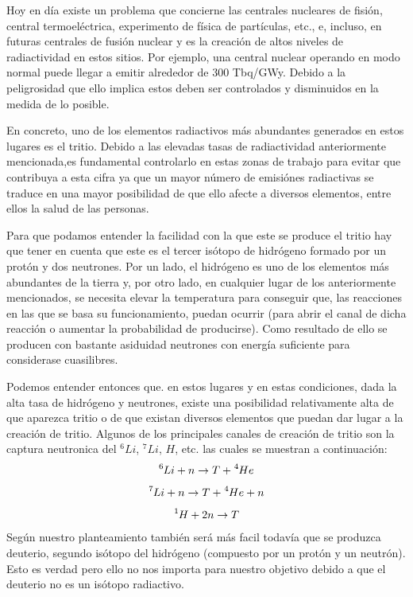 Hoy en día existe un problema que concierne  las  centrales nucleares de fisión, central termoeléctrica,  experimento de física de partículas, etc., e, incluso, en futuras centrales de fusión nuclear y es la creación de altos niveles de radiactividad en estos sitios. Por ejemplo, una central nuclear operando en modo normal puede llegar a emitir alrededor de 300 Tbq/GWy.  Debido a la peligrosidad que ello implica estos deben ser controlados y disminuidos en la medida de lo posible.

En concreto, uno de los elementos radiactivos más abundantes generados en estos lugares es el tritio. Debido a las elevadas tasas de radiactividad anteriormente mencionada,es fundamental controlarlo en estas zonas de trabajo para evitar que contribuya a esta cifra ya que un mayor número de emisiónes radiactivas se traduce en una mayor posibilidad de que ello afecte a diversos elementos, entre ellos la salud de las personas.

Para que podamos entender la facilidad con la que este se produce el tritio hay que tener en cuenta que este es el tercer isótopo de hidrógeno formado por un protón y dos neutrones. Por un lado, el hidrógeno es uno de los elementos más abundantes de la tierra y, por otro lado, en cualquier lugar de los anteriormente mencionados, se necesita elevar la temperatura para conseguir que, las reacciones en las que se basa su funcionamiento, puedan ocurrir (para abrir el canal de dicha reacción o aumentar la probabilidad de producirse). Como resultado de ello se producen con bastante asiduidad neutrones con energía suficiente para considerase cuasilibres. 

Podemos entender entonces que. en estos lugares y en estas condiciones, dada la alta tasa de hidrógeno y neutrones, existe una posibilidad relativamente alta de que aparezca tritio o de que existan diversos elementos que puedan dar lugar a la creación de tritio. Algunos de los principales canales de creación de tritio son la captura neutronica del $^6Li$, $^7Li$, $H$, etc. las cuales se muestran a continuación:
$$\ce{^{6}{Li}} + n \rightarrow T + \ce{^{4}{He}}$$
$$\ce{^{7}{Li}} + n \rightarrow T + \ce{^{4}{He}} + n$$
$$\ce{^{1}{H}} + 2n \rightarrow T $$
Según nuestro planteamiento también será más facil todavía que se produzca deuterio, segundo isótopo del hidrógeno (compuesto por un protón y un neutrón). Esto es verdad pero ello no nos importa para nuestro objetivo debido a que el deuterio no es un isótopo radiactivo.

